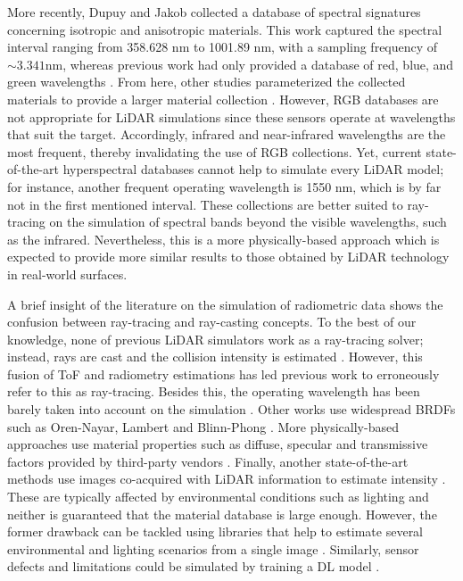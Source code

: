 More recently, Dupuy and Jakob \cite{dupuy_adaptive_2018} collected a database of spectral signatures concerning isotropic and anisotropic materials. This work captured the spectral interval ranging from 358.628 \si{\nano\meter} to 1001.89 \si{\nano\meter}, with a sampling frequency of $\sim3.341$\si{\nano\meter}, whereas previous work had only provided a database of red, blue, and green wavelengths \cite{matusik_data-driven_2003}. From here, other studies parameterized the collected materials to provide a larger material collection \cite{serrano_intuitive_2016}. However, RGB databases are not appropriate for LiDAR simulations since these sensors operate at wavelengths that suit the target. Accordingly, infrared and near-infrared wavelengths are the most frequent, thereby invalidating the use of RGB collections. Yet, current state-of-the-art hyperspectral databases cannot help to simulate every LiDAR model; for instance, another frequent operating wavelength is 1550 \si{\nano\meter}, which is by far not in the first mentioned interval. These collections are better suited to ray-tracing on the simulation of spectral bands beyond the visible wavelengths, such as the infrared. Nevertheless, this is a more physically-based approach which is expected to provide more similar results to those obtained by LiDAR technology in real-world surfaces.

A brief insight of the literature on the simulation of radiometric data shows the confusion between ray-tracing and ray-casting concepts. To the best of our knowledge, none of previous LiDAR simulators work as a ray-tracing solver; instead, rays are cast and the collision intensity is estimated \cite{ahn_real-time_2020, zhao_method_2021, bechtold_helios_2016}. However, this fusion of ToF and radiometry estimations has led previous work to erroneously refer to this as ray-tracing. Besides this, the operating wavelength has been barely taken into account on the simulation \cite{chen_analysis_2022, gschwandtner_blensor_2011, zohdi_rapid_2020}. Other works use widespread BRDFs such as Oren-Nayar, Lambert and Blinn-Phong \cite{chen_analysis_2022}. More physically-based approaches use material properties such as diffuse, specular and transmissive factors provided by third-party vendors \cite{haider_development_2022}. Finally, another state-of-the-art methods use images co-acquired with LiDAR information to estimate intensity \cite{vacek_learning_2022, xiao_synlidar_2021}. These are typically affected by environmental conditions such as lighting and neither is guaranteed that the material database is large enough. However, the former drawback can be tackled using libraries that help to estimate several environmental and lighting scenarios from a single image \cite{buslaev_albumentations_2020}. Similarly, sensor defects and limitations could be simulated by training a DL model \cite{guillard_learning_2022}.  

